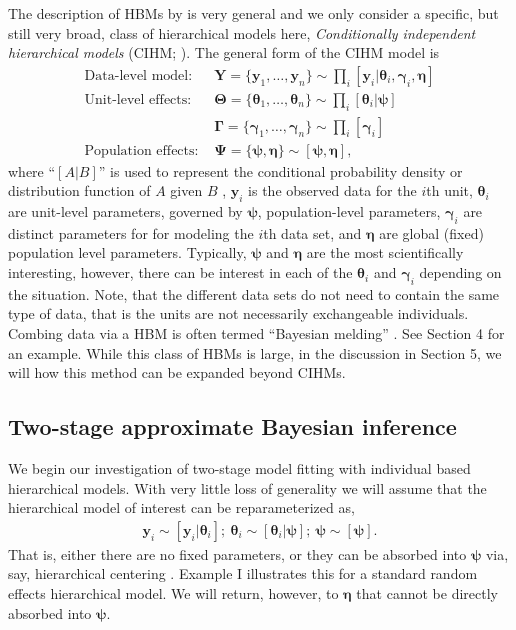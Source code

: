 \documentclass[12pt]{article}
\newcommand{\by}{\mathbf{y}}
\newcommand{\bt}{\boldsymbol{\theta}}
\newcommand{\bn}{\boldsymbol{\eta}}
\newcommand{\bT}{\boldsymbol{\Theta}}
\newcommand{\bp}{\boldsymbol{\psi}}
\newcommand{\bP}{\boldsymbol{\Psi}}
\newcommand{\bg}{\boldsymbol{\gamma}}
\newcommand{\bG}{\boldsymbol{\Gamma}}
\newcommand{\bY}{\mathbf{Y}}
\begin{document}
The description of HBMs by \cite{berliner1996hierarchical} is very general and we only consider a specific, but still very broad, class of hierarchical models here, {\it Conditionally independent hierarchical models} (CIHM; \citealt{kass1989approximate,gelfand2015hierarchical}). The general form of the CIHM model is
\begin{equation}\label{eq:full.model}
\begin{aligned}
\text{Data-level model: } & \bY = \{\by_1,\dots,\by_n\} \sim \prod_i[\by_i|\bt_i, \bg_i, \bn] \\
\text{Unit-level effects: } & \bT = \{\bt_1,\dots,\bt_n\} \sim \prod_i[\bt_i|\bp]\\
 & \bG = \{\bg_1,\dots,\bg_n\} \sim \prod_i[\bg_i] \\
\text{Population effects: } & \bP = \{\bp,\bn\} \sim [\bp,\bn],
\end{aligned}
\end{equation}
where ``$[A|B]$'' is used to represent the conditional probability density or distribution function of $A$ given $B$ \citep{gelfand1990sampling}, $\by_i$ is the observed data for the $i$th unit, $\bt_i$ are unit-level parameters, governed by $\bp$, population-level parameters, $\bg_i$ are distinct parameters for for modeling the $i$th data set, and $\bn$ are global (fixed) population level parameters. Typically, $\bp$ and $\bn$ are the most scientifically interesting, however, there can be interest in each of the $\bt_i$ and $\bg_i$ depending on the situation. Note, that the different data sets do not need to contain the same type of data, that is the units are not necessarily exchangeable individuals. Combing data via a HBM is often termed ``Bayesian melding''  \citep{goudie2019joining, liu2014bayesian}. See Section 4 for an example. While this class of HBMs is large, in the discussion in Section 5, we will how this method can be expanded beyond CIHMs.


\subsection{Two-stage approximate Bayesian inference}

We begin our investigation of two-stage model fitting with individual based hierarchical models. With very little loss of generality we will assume that the hierarchical model of interest can be reparameterized as,
\[
\begin{gathered}
\by_i \sim [\by_i|\bt_i];\  \bt_i \sim [\bt_i|\bp];\ \bp \sim [\bp].
\end{gathered}
\]
That is, either there are no fixed parameters, or they can be absorbed into $\bp$ via, say, hierarchical centering \citep{Gelfand:1996zq}. Example I illustrates this for a standard random effects hierarchical model. We will return, however, to $\bn$ that cannot be directly absorbed into $\bp$. 
\end{document}

